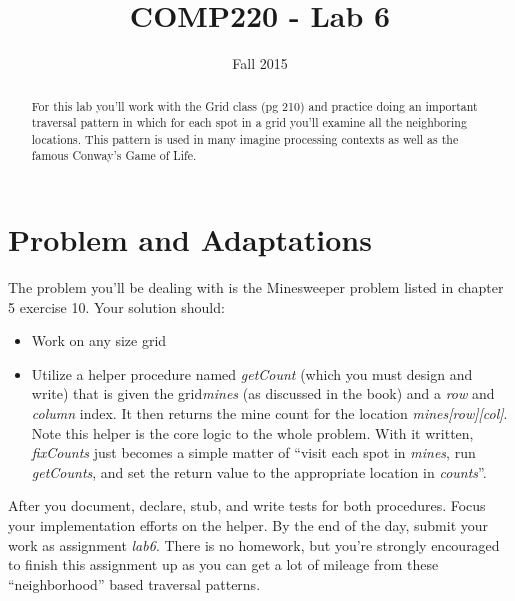 \documentclass[10pt]{article}
\title{COMP220 - Lab 6}
\author{ }
\date{Fall 2015}
\begin{document}
\maketitle

\begin{abstract}
For this lab you'll work with the Grid class (pg 210) and practice doing an important traversal pattern in which for each spot in a grid you'll examine all the neighboring locations. This pattern is used in many imagine processing contexts as well as the famous Conway's Game of Life.
\end{abstract}

\section{Problem and Adaptations}

The problem you'll be dealing with is the Minesweeper problem listed in chapter 5 exercise 10. Your solution should:
\begin{itemize}
\item Work on any size grid
\item Utilize a helper procedure named \textit{getCount} (which you must design and write) that is given the grid\textit{mines} (as discussed in the book) and a \textit{row} and \textit{column} index. It then returns the mine count for the location \textit{mines[row][col]}. Note this helper is the core logic to the whole problem. With it written, \textit{fixCounts} just becomes a simple matter of ``visit each spot in \textit{mines}, run \textit{getCounts}, and set the return value to the appropriate location in \textit{counts}''.
\end{itemize}
After you document, declare, stub, and write tests for both procedures. Focus your implementation efforts on the helper. By the end of the day, submit your work as assignment \textit{lab6}. There is no homework, but you're strongly encouraged to finish this assignment up as you can get a lot of mileage from these ``neighborhood'' based traversal patterns.

 
\end{document}

